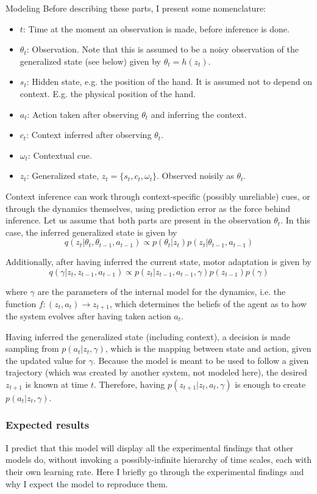 \documentclass{report}
\begin{document}
\begin{chapter}{Modeling}
Before describing these parts, I present some nomenclature:
\begin{itemize}
\item $t$: Time at the moment an observation is made, before inference is done.
\item $\theta_t$: Observation. Note that this is assumed to be a noisy
observation of the generalized state (see below) given by $\theta_t = h(z_t)$.
\item $s_t$: Hidden state, e.g. the position of the hand. It is assumed not to
depend on context. E.g. the physical position of the hand.
\item $a_t$: Action taken after observing $\theta_t$ and inferring the context.
\item $c_t$: Context inferred after observing $\theta_t$.
\item $\omega_t$: Contextual cue.
\item $z_t$: Generalized state, $z_t = \{s_t, c_t, \omega_t\}$. Observed noisily
as $\theta_t$.
\end{itemize}

Context inference can work through context-specific (possibly unreliable) cues,
or through the dynamics themselves, using prediction error as the force behind
inference. Let us assume that both parts are present in the observation
$\theta_t$. In this case, the inferred generalized state is given by
\[
  q(z_t | \theta_t, \theta_{t-1}, a_{t-1}) \propto p(\theta_t | z_t)p(z_t|\theta_{t-1}, a_{t-1})
\]
  
Additionally, after having inferred the current state, motor adaptation is given by
\[
q(\gamma | z_t, z_{t-1}, a_{t-1}) \propto p(z_t | z_{t-1}, a_{t-1}, \gamma)p(z_{t-1})p(\gamma)
\]

where $\gamma$ are the parameters of the internal model for the dynamics,
i.e. the function $f: (z_t, a_t) \rightarrow z_{t+1}$, which determines the beliefs of
the agent as to how the system evolves after having taken action $a_t$.

Having inferred the generalized state (including context), a decision is made
sampling from $p(a_t | z_t, \gamma)$, which is the mapping between state and
action, given the updated value for $\gamma$. Because the model is meant to be
used to follow a given trajectory (which was created by another system, not
modeled here), the desired $z_{t+1}$ is known at time $t$. Therefore, having
$p(z_{t+1} | z_t, a_t, \gamma)$ is enough to create $p(a_t | z_t, \gamma)$.

\subsubsection{Expected results}
I predict that this model will display all the experimental findings that other
models do, without invoking a possibly-infinite hierarchy of time scales, each
with their own learning rate. Here I briefly go through the experimental
findings and why I expect the model to reproduce them.


\end{chapter}
\end{document}
